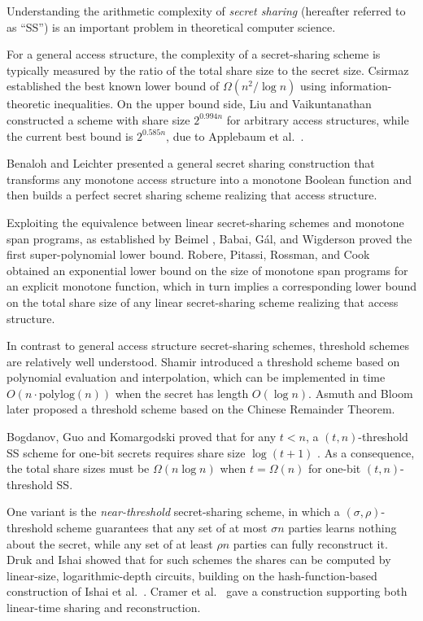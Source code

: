 \documentclass[11pt]{article}
\begin{document}
Understanding the arithmetic complexity of \emph{secret sharing} (hereafter referred to as ``SS'') is an important problem in theoretical computer science.

For a general access structure, the complexity of a secret-sharing scheme is typically measured by the ratio of the total share size to the secret size. Csirmaz \cite{csirmaz1997size} established the best known lower bound of $\Omega(n^2 / \log n)$ using information-theoretic inequalities. On the upper bound side, Liu and Vaikuntanathan \cite{liu2018breaking} constructed a scheme with share size $2^{0.994 n}$ for arbitrary access structures, while the current best bound is $2^{0.585 n}$, due to Applebaum et al.~\cite{applebaum2019secret, applebaum2020better}.

Benaloh and Leichter \cite{benaloh1988generalized} presented a general secret sharing construction that transforms any monotone access structure into a monotone Boolean function and then builds a perfect secret sharing scheme realizing that access structure.

Exploiting the equivalence between linear secret-sharing schemes and monotone span programs, as established by Beimel \cite{beimel1996secure}, Babai, G{\'a}l, and Wigderson \cite{babai1999superpolynomial} proved the first super-polynomial lower bound. Robere, Pitassi, Rossman, and Cook \cite{robere2016exponential} obtained an exponential lower bound on the size of monotone span programs for an explicit monotone function, which in turn implies a corresponding lower bound on the total share size of any linear secret-sharing scheme realizing that access structure.

In contrast to general access structure secret-sharing schemes, threshold schemes are relatively well understood. Shamir \cite{shamir1979share} introduced a threshold scheme based on polynomial evaluation and interpolation, which can be implemented in time $O(n \cdot \mathrm{polylog}(n))$ when the secret has length $O(\log n)$. Asmuth and Bloom \cite{asmuth1983modular} later proposed a threshold scheme based on the Chinese Remainder Theorem.


Bogdanov, Guo and Komargodski proved that for any $t < n$, a $(t, n)$-threshold SS scheme for one-bit secrets requires share size $\log(t + 1)$ \cite{bogdanov2016threshold}. As a consequence, the total share sizes must be $\Omega(n \log n)$ when $t = \Omega(n)$ for one-bit $(t, n)$-threshold SS.


One variant is the \emph{near-threshold} secret-sharing scheme, in which a $(\sigma, \rho)$-threshold scheme guarantees that any set of at most $\sigma n$ parties learns nothing about the secret, while any set of at least $\rho n$ parties can fully reconstruct it. Druk and Ishai \cite{druk2014linear} showed that for such schemes the shares can be computed by linear-size, logarithmic-depth circuits, building on the hash-function-based construction of Ishai et al.~\cite{ishai2008cryptography}. Cramer et al.~\cite{cramer2015linear} gave a construction supporting both linear-time sharing and reconstruction. 
\end{document}
